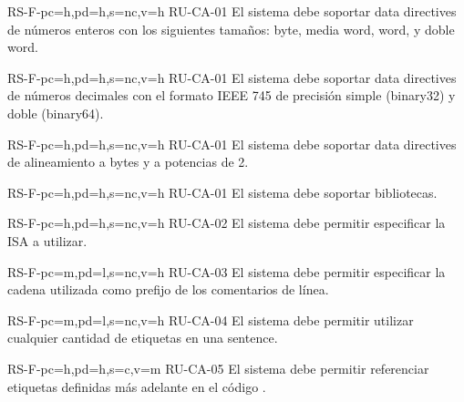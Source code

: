 \begin{softwareReq}{RS-F-}{pc=h,pd=h,s=nc,v=h}
    {RU-CA-01}
    El sistema debe soportar \glspl{data directive} de números enteros con los
    siguientes tamaños: byte, media \gls{word}, \gls{word}, y doble \gls{word}.
\end{softwareReq}

\begin{softwareReq}{RS-F-}{pc=h,pd=h,s=nc,v=h}
    {RU-CA-01}
    El sistema debe soportar \glspl{data directive} de números decimales con el
    formato IEEE 745 de precisión simple (binary32) y doble (binary64).
\end{softwareReq}

\begin{softwareReq}{RS-F-}{pc=h,pd=h,s=nc,v=h}
    {RU-CA-01}
    El sistema debe soportar \glspl{data directive} de alineamiento a bytes y a
    potencias de 2.
\end{softwareReq}

\begin{softwareReq}{RS-F-}{pc=h,pd=h,s=nc,v=h}
    {RU-CA-01}
    El sistema debe soportar bibliotecas. %
\end{softwareReq}

\begin{softwareReq}{RS-F-}{pc=h,pd=h,s=nc,v=h}
    {RU-CA-02}
    El sistema debe permitir especificar la \gls{ISA} a utilizar.
\end{softwareReq}

\begin{softwareReq}{RS-F-}{pc=m,pd=l,s=nc,v=h}
    {RU-CA-03}
    El sistema debe permitir especificar la cadena utilizada como prefijo de los
    comentarios de línea.
\end{softwareReq}

\begin{softwareReq}{RS-F-}{pc=m,pd=l,s=nc,v=h}
    {RU-CA-04}
    El sistema debe permitir utilizar cualquier cantidad de etiquetas en una
    \gls{sentence}.
\end{softwareReq}

\begin{softwareReq}{RS-F-}{pc=h,pd=h,s=c,v=m}
    {RU-CA-05}
    El sistema debe permitir referenciar etiquetas definidas más adelante en el
    código .
\end{softwareReq}

